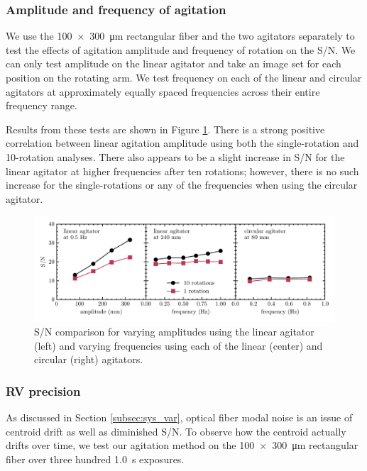 \documentclass[11pt]{article}
\begin{document}
\subsubsection{Amplitude and frequency of agitation}

We use the \SI{100x300}{\micro\meter} rectangular fiber and the two agitators separately to test the effects of agitation amplitude and frequency of rotation on the S/N. We can only test amplitude on the linear agitator and take an image set for each position on the rotating arm. We test frequency on each of the linear and circular agitators at approximately equally spaced frequencies across their entire frequency range.

Results from these tests are shown in Figure \ref{fig:amp_freq_snr}. There is a strong positive correlation between linear agitation amplitude using both the single-rotation and 10-rotation analyses. There also appears to be a slight increase in S/N for the linear agitator at higher frequencies after ten rotations; however, there is no such increase for the single-rotations or any of the frequencies when using the circular agitator.

\begin{figure}
\centering
	\includegraphics[width=\textwidth]{images/amp_freq_snr.pdf}
	\caption{S/N comparison for varying amplitudes using the linear agitator (left) and varying frequencies using each of the linear (center) and circular (right) agitators.}
\label{fig:amp_freq_snr}
\end{figure}

\subsubsection{RV precision}

As discussed in Section \ref{subsec:sys_var}, optical fiber modal noise is an issue of centroid drift as well as diminished S/N. To observe how the centroid actually drifts over time, we test our agitation method on the \SI{100x300}{\micro\meter} rectangular fiber over three hundred \SI{1.0}{\second} exposures.
\end{document}
